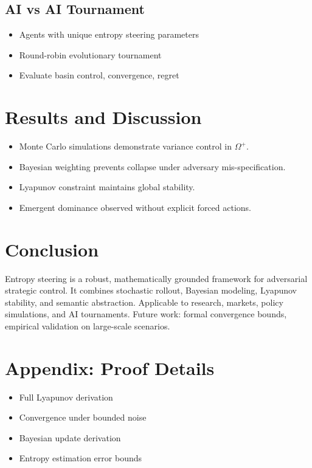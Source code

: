 \documentclass[12pt]{article}
\begin{document}
\subsection{AI vs AI Tournament}
\begin{itemize}
    \item Agents with unique entropy steering parameters
    \item Round-robin evolutionary tournament
    \item Evaluate basin control, convergence, regret
\end{itemize}

\section{Results and Discussion}
\begin{itemize}
    \item Monte Carlo simulations demonstrate variance control in $\Omega^+$.
    \item Bayesian weighting prevents collapse under adversary mis-specification.
    \item Lyapunov constraint maintains global stability.
    \item Emergent dominance observed without explicit forced actions.
\end{itemize}

\section{Conclusion}
Entropy steering is a robust, mathematically grounded framework for adversarial strategic control.
It combines stochastic rollout, Bayesian modeling, Lyapunov stability, and semantic abstraction.
Applicable to research, markets, policy simulations, and AI tournaments.
Future work: formal convergence bounds, empirical validation on large-scale scenarios.

\appendix

\section{Appendix: Proof Details}
\begin{itemize}
    \item Full Lyapunov derivation
    \item Convergence under bounded noise
    \item Bayesian update derivation
    \item Entropy estimation error bounds
\end{itemize}
\end{document}
